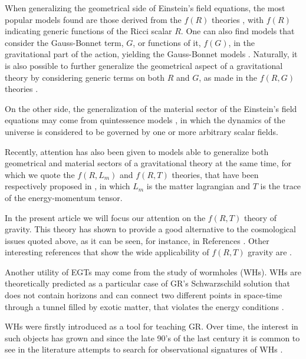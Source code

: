 \documentclass[twocolumn,showpacs,aps,amssymb,floatfix,prd,amsmath,preprintnumbers]{revtex4}
\begin{document}
When generalizing the geometrical side of Einstein's field equations, the most popular models found are those derived from the $f(R)$ theories \cite{sotiriou/2010,de_felice/2010}, with $f(R)$ indicating generic functions of the Ricci scalar $R$. One can also find models that consider the Gauss-Bonnet term, $G$, or functions of it, $f(G)$, in the gravitational part of the action, yielding the Gauss-Bonnet models \cite{nojiri/2005,ivashchuk/2016}. Naturally, it is also possible to further generalize the geometrical aspect of a gravitational theory by considering generic terms on both $R$ and $G$, as made in the $f(R,G)$ theories \cite{bamba/2010,de_laurentis/2015}.

On the other side, the generalization of the material sector of the Einstein's field equations may come from quintessence models \cite{chimento/2003,ms/2014}, in which the dynamics of the universe is considered to be governed by one or more arbitrary scalar fields.

Recently, attention has also been given to models able to generalize both geometrical and material sectors of a gravitational theory at the same time, for which we quote the $f(R,L_m)$ and $f(R,T)$ theories, that have been respectively proposed in \cite{harko/2010,harko/2011}, in which $L_m$ is the matter lagrangian and $T$ is the trace of the energy-momentum tensor.

In the present article we will focus our attention on the $f(R,T)$ theory of gravity. This theory has shown to provide a good alternative to the cosmological issues quoted above, as it can be seen, for instance, in References \cite{ms/2017,shabani/2017,zaregonbadi/2016,baffou/2015,sun/2016}. Other interesting references that show the wide applicability of $f(R,T)$ gravity are \cite{das/2017,das/2016,mam/2016,amam/2016}.

Another utility of EGTs may come from the study of wormholes (WHs). WHs are theoretically predicted as a particular case of GR's Schwarzschild solution that does not contain horizons and can connect two different points in space-time through a tunnel filled by exotic matter, that violates the energy conditions \cite{morris/1988,morris/1988b}. 

WHs were firstly introduced as a tool for teaching GR. Over time, the interest in such objects has grown and since the late 90's of the last century it is common to see in the literature attempts to search for observational signatures of WHs \cite{zhou/2016,harko/2008,safonova/2002}.
\end{document}
